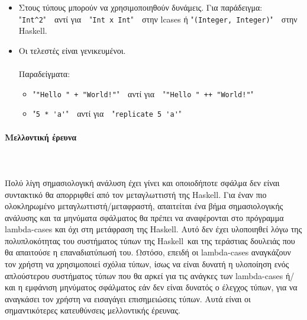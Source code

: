 \documentclass[diploma]{softlab-thesis}
\def\H{Haskell}
\def\pend{\mbox{}\\\\}
\begin{document}
\begin{itemize}
\begin{itemize}
\item
\begin{verbatim}
(cases, cases)
  (green, green) => true
  (amber, amber) => true
  (red, red) => true
  ... => false
\end{verbatim}
αντί για
\begin{verbatim}
\x y -> case (x, y) of
  (Green, Green) -> True
  (Amber, Amber) -> True
  (Red, Red) -> True
  _ -> False
\end{verbatim}
\end{itemize}

\item
Στους τύπους μπορούν να χρησιμοποιηθούν δυνάμεις. Για παράδειγμα:\\

"\verb|Int^2|"\ \  αντί για\ \  "\verb|Int x Int|"\ \ στην lcases ή
"\verb|(Integer, Integer)|"\ \
στην \H. \\

\item
Οι τελεστές είναι γενικευμένοι.  \\\\
Παραδείγματα:

\begin{itemize}

\item
"\verb|"Hello " + "World!"|"\ \ αντί για\ \ "\verb|"Hello " ++ "World!"|"

\item
"\verb|5 * 'a'|"\ \ αντί για\ \ "\verb|replicate 5 'a'|"

\end{itemize}


\end{itemize}

\newpage
\paragraph{Μελλοντική έρευνα}\pend
Πολύ λίγη σημασιολογική ανάλυση έχει γίνει και οποιοδήποτε σφάλμα δεν είναι
συντακτικό θα απορριφθεί από τον μεταγλωττιστή της \H. Για έναν
πιο ολοκληρωμένο μεταγλωττιστή/μεταφραστή, απαιτείται ένα βήμα σημασιολογικής
ανάλυσης και τα μηνύματα σφάλματος θα πρέπει να αναφέρονται στο πρόγραμμα
lambda-cases και όχι στη μετάφραση της \H. Αυτό δεν έχει υλοποιηθεί λόγω της
πολυπλοκότητας του συστήματος τύπων της \H\ και της τεράστιας δουλειάς που θα
απαιτούσε η επαναδιατύπωσή του. Ωστόσο, επειδή οι lambda-cases αναγκάζουν τον
χρήστη να χρησιμοποιεί σχόλια τύπων, ίσως να είναι δυνατή η υλοποίηση ενός
απλούστερου συστήματος τύπων που θα αρκεί για τις ανάγκες των lambda-cases
ή/και η εμφάνιση μηνύματος σφάλματος εάν δεν είναι δυνατός ο έλεγχος τύπων,
για να αναγκάσει τον χρήστη να εισαγάγει επισημειώσεις τύπων.
Αυτά είναι οι σημαντικότερες κατευθύνσεις μελλοντικής έρευνας.
\end{document}
